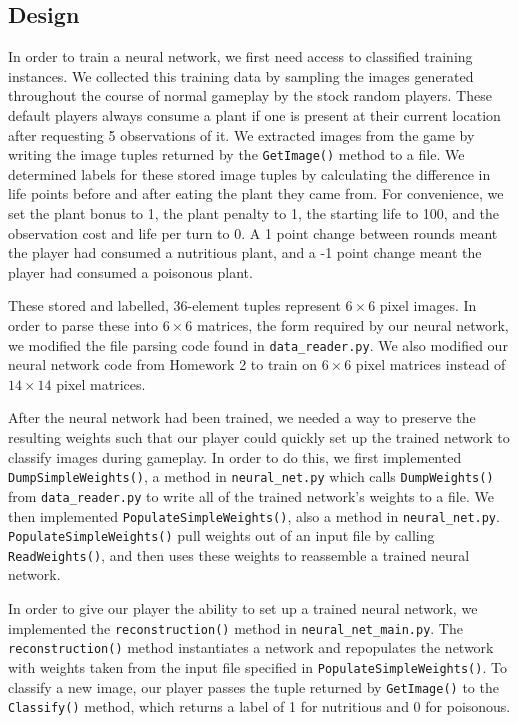\documentclass[solution, letterpaper]{cs121}
\begin{document}
\subsection{Design}
\hspace{4mm} In order to train a neural network, we first need access to classified training instances. We collected this training data by sampling the images generated throughout the course of normal gameplay by the stock random players. These default players always consume a plant if one is present at their current location after requesting 5 observations of it. We extracted images from the game by writing the image tuples returned by the {\tt GetImage()} method to a file. We determined labels for these stored image tuples by calculating the difference in life points before and after eating the plant they came from. For convenience, we set the plant bonus to 1, the plant penalty to 1, the starting life to 100, and the observation cost and life per turn to 0. A 1 point change between rounds meant the player had consumed a nutritious plant, and a -1 point change meant the player had consumed a poisonous plant.

These stored and labelled, 36-element tuples represent $6 \times 6$ pixel images. In order to parse these into $6 \times 6$ matrices, the form required by our neural network, we modified the file parsing code found in {\tt data\_reader.py}. We also modified our neural network code from Homework 2 to train on $6 \times 6$ pixel matrices instead of $14 \times 14$ pixel matrices.

After the neural network had been trained, we needed a way to preserve the resulting weights such that our player could quickly set up the trained network to classify images during gameplay. In order to do this, we first implemented {\tt DumpSimpleWeights()}, a method in {\tt neural\_net.py} which calls {\tt DumpWeights()} from {\tt data\_reader.py} to write all of the trained network's weights to a file. We then implemented {\tt PopulateSimpleWeights()}, also a method in {\tt neural\_net.py}. {\tt PopulateSimpleWeights()} pull weights out of an input file by calling {\tt ReadWeights()}, and then uses these weights to reassemble a trained neural network.

In order to give our player the ability to set up a trained neural network, we implemented the {\tt reconstruction()} method in {\tt neural\_net\_main.py}. The {\tt reconstruction()} method instantiates a network and repopulates the network with weights taken from the input file specified in {\tt PopulateSimpleWeights()}. To classify a new image, our player passes the tuple returned by {\tt GetImage()} to the {\tt Classify()} method, which returns a label of 1 for nutritious and 0 for poisonous.
\end{document}

